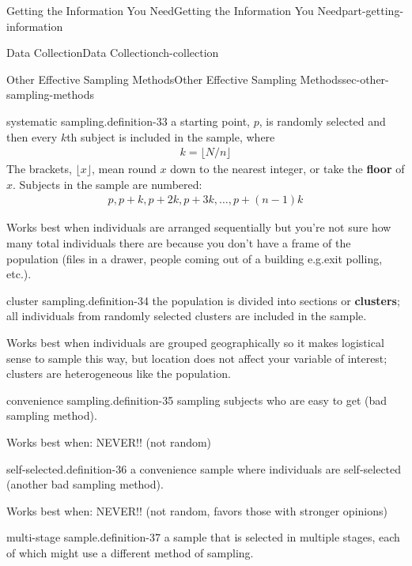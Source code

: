 \documentclass[oneside,10pt,]{book}
\newcommand{\terminology}[1]{\textbf{#1}}
\numberwithin{equation}{section}
\begin{document}
\begin{partptx}{Getting the Information You Need}{}{Getting the Information You Need}{}{}{part-getting-information}
\begin{chapterptx}{Data Collection}{}{Data Collection}{}{}{ch-collection}
\begin{sectionptx}{Other Effective Sampling Methods}{}{Other Effective Sampling Methods}{}{}{sec-other-sampling-methods}
\begin{definition}{systematic sampling.}{definition-33}%
\hypertarget{p-20}{}%
a starting point, \(p\), is randomly selected and then every \(k\)th subject is included in the sample, where%
\begin{gather*}
k = \lfloor N/n \rfloor
\end{gather*}
The brackets, \(\lfloor x \rfloor\), mean round \(x\) down to the nearest integer, or take the \terminology{floor} of \(x\). Subjects in the sample are numbered:%
\begin{gather*}
p, p+k, p+2k, p+3k, \ldots, p+(n-1)k
\end{gather*}
%
\par
\hypertarget{p-21}{}%
Works best when individuals are arranged sequentially but you’re not sure how many total individuals there are because you don’t have a frame of the population (files in a drawer, people coming out of a building e.g.\@ exit polling, etc.\@).%
\end{definition}
\begin{definition}{cluster sampling.}{definition-34}%
\hypertarget{p-22}{}%
the population is divided into sections or \terminology{clusters}; all individuals from randomly selected clusters are included in the sample.%
\par
\hypertarget{p-23}{}%
Works best when individuals are grouped geographically so it makes logistical sense to sample this way, but location does not affect your variable of interest; clusters are heterogeneous like the population.%
\end{definition}
\begin{definition}{convenience sampling.}{definition-35}%
\hypertarget{p-24}{}%
sampling subjects who are easy to get (bad sampling method).%
\par
\hypertarget{p-25}{}%
Works best when: NEVER!! (not random)%
\end{definition}
\begin{definition}{self-selected.}{definition-36}%
\hypertarget{p-26}{}%
a convenience sample where individuals are self-selected (another bad sampling method).%
\par
\hypertarget{p-27}{}%
Works best when: NEVER!! (not random, favors those with stronger opinions)%
\end{definition}
\begin{definition}{multi-stage sample.}{definition-37}%
\hypertarget{p-28}{}%
a sample that is selected in multiple stages, each of which might use a different method of sampling.%

\end{definition}
\end{sectionptx}
\end{chapterptx}
\end{partptx}
\end{document}
